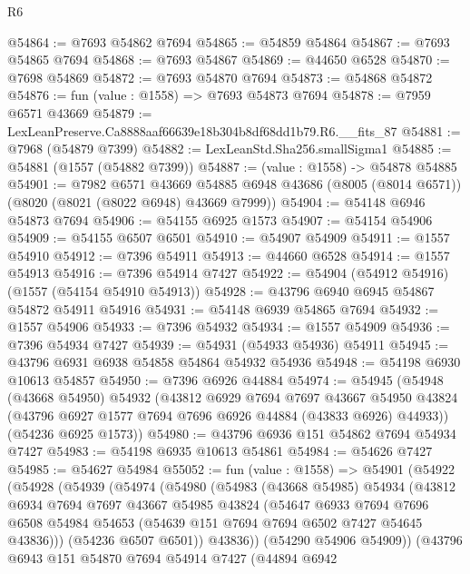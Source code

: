 \begin{lexlean}{R6}
\begin{coremodule}
@54864 := @7693 @54862 @7694
@54865 := @54859 @54864
@54867 := @7693 @54865 @7694
@54868 := @7693 @54867
@54869 := @44650 @6528
@54870 := @7698 @54869
@54872 := @7693 @54870 @7694
@54873 := @54868 @54872
@54876 := fun (value : @1558) => @7693 @54873 @7694
@54878 := @7959 @6571 @43669
@54879 := LexLeanPreserve.Ca8888aaf66639e18b304b8df68dd1b79.R6.__fits_87
@54881 := @7968 (@54879 @7399)
@54882 := LexLeanStd.Sha256.smallSigma1
@54885 := @54881 (@1557 (@54882 @7399))
@54887 := (value : @1558) -> @54878 @54885
@54901 := @7982
    @6571
    @43669
    @54885
    @6948
    @43686
    (@8005 (@8014 @6571))
    (@8020 (@8021 (@8022 @6948) @43669 @7999))
@54904 := @54148 @6946 @54873 @7694
@54906 := @54155 @6925 @1573
@54907 := @54154 @54906
@54909 := @54155 @6507 @6501
@54910 := @54907 @54909
@54911 := @1557 @54910
@54912 := @7396 @54911
@54913 := @44660 @6528
@54914 := @1557 @54913
@54916 := @7396 @54914 @7427
@54922 := @54904 (@54912 @54916) (@1557 (@54154 @54910 @54913))
@54928 := @43796 @6940 @6945 @54867 @54872 @54911 @54916
@54931 := @54148 @6939 @54865 @7694
@54932 := @1557 @54906
@54933 := @7396 @54932
@54934 := @1557 @54909
@54936 := @7396 @54934 @7427
@54939 := @54931 (@54933 @54936) @54911
@54945 := @43796 @6931 @6938 @54858 @54864 @54932 @54936
@54948 := @54198 @6930 @10613 @54857
@54950 := @7396 @6926 @44884
@54974 := @54945
    (@54948
      (@43668 @54950)
      @54932
      (@43812
        @6929
        @7694
        @7697
        @43667
        @54950
        @43824
        (@43796 @6927 @1577 @7694 @7696 @6926 @44884 (@43833 @6926) @44933))
      (@54236 @6925 @1573))
@54980 := @43796 @6936 @151 @54862 @7694 @54934 @7427
@54983 := @54198 @6935 @10613 @54861
@54984 := @54626 @7427
@54985 := @54627 @54984
@55052 := fun (value : @1558) =>
  @54901
    (@54922
      (@54928
        (@54939
          (@54974
            (@54980
              (@54983
                (@43668 @54985)
                @54934
                (@43812
                  @6934
                  @7694
                  @7697
                  @43667
                  @54985
                  @43824
                  (@54647
                    @6933
                    @7694
                    @7696
                    @6508
                    @54984
                    @54653
                    (@54639 @151 @7694 @7694 @6502 @7427 @54645 @43836)))
                (@54236 @6507 @6501))
              @43836))
          (@54290 @54906 @54909))
        (@43796
          @6943
          @151
          @54870
          @7694
          @54914
          @7427
          (@44894
            @6942

\end{coremodule}
\end{lexlean}
